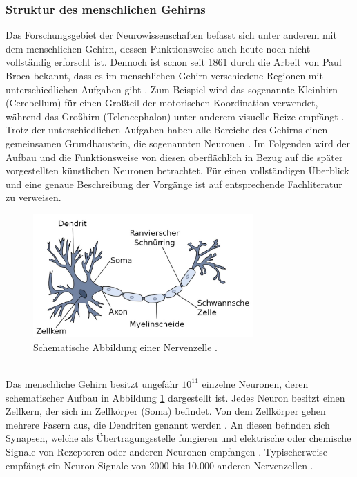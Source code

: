 \subsubsection{Struktur des menschlichen Gehirns}
Das Forschungsgebiet der Neurowissenschaften befasst sich unter anderem mit dem menschlichen Gehirn, dessen Funktionsweise auch heute noch nicht vollständig erforscht ist. Dennoch ist schon seit 1861 durch die Arbeit von Paul Broca bekannt, dass es im menschlichen Gehirn verschiedene Regionen mit unterschiedlichen Aufgaben gibt \cite{russell2013kunstliche}. Zum Beispiel wird das sogenannte Kleinhirn (Cerebellum) für einen Großteil der motorischen Koordination verwendet, während das Großhirn (Telencephalon) unter anderem visuelle Reize empfängt \cite{kriesel2008kleiner}. Trotz der unterschiedlichen Aufgaben haben alle Bereiche des Gehirns einen gemeinsamen Grundbaustein, die sogenannten Neuronen \cite{russell2013kunstliche}. Im Folgenden wird der Aufbau und die Funktionsweise von diesen oberflächlich in Bezug auf die später vorgestellten künstlichen Neuronen betrachtet. Für einen vollständigen Überblick und eine genaue Beschreibung der Vorgänge ist auf entsprechende Fachliteratur zu verweisen.
\begin{figure}[h]
	\centering
	\includegraphics[width=0.75\textwidth]{./img/biologial_neuron.JPG} 
	\caption{Schematische Abbildung einer Nervenzelle \cite{kriesel2008kleiner}.}
	\label{fig:biological_neuron}
\end{figure}
\\ \noindent
Das menschliche Gehirn besitzt ungefähr ${10}^{11}$ einzelne Neuronen, deren schematischer Aufbau in Abbildung \ref{fig:biological_neuron} dargestellt ist. Jedes Neuron besitzt einen Zellkern, der sich im Zellkörper (Soma) befindet. Von dem Zellkörper gehen mehrere Fasern aus, die Dendriten genannt werden \cite{russell2013kunstliche}. An diesen befinden sich Synapsen, welche als Übertragungsstelle fungieren und elektrische oder chemische Signale von Rezeptoren oder anderen Neuronen empfangen \cite{kriesel2008kleiner}. Typischerweise empfängt ein Neuron Signale von 2000 bis 10.000 anderen Nervenzellen \cite{zell2003simulation}.  %
